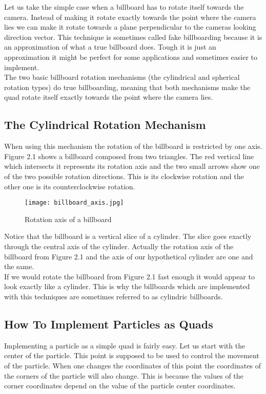 Let us take the simple case when a billboard has to rotate itself towards the camera. Instead of making it rotate exactly towards the point where the camera lies we can make it rotate towards a plane perpendicular to the cameras looking direction vector. This technique is sometimes called fake billboarding because it is an approximation of what a true billboard does. Tough it is just an approximation it might be perfect for some applications and sometimes easier to implement.\\

The two basic billboard rotation mechanisms (the cylindrical and spherical rotation types) do true billboarding, meaning that both mechanisms make the quad rotate itself exactly towards the point where the camera lies.

\newpage
\subsection{The Cylindrical Rotation Mechanism}
When using this mechanism the rotation of the billboard is restricted by one axis. Figure 2.1 shows a billboard composed from two triangles. The red vertical line which intersects it represents its rotation axis and the two small arrows show one of the two possible rotation directions. This is its clockwise rotation and the other one is its counterclockwise rotation.

\begin{figure}[h]
	\caption{Rotation axis of a billboard}
	\centering
	\texttt{[image: billboard\_axis.jpg]}
\end{figure}

Notice that the billboard is a vertical slice of a cylinder. The slice goes exactly through the central axis of the cylinder. Actually the rotation axis of the billboard from Figure 2.1 and the axis of our hypothetical cylinder are one and the same.\\

If we would rotate the billboard from Figure 2.1 fast enough it would appear to look exactly like a cylinder. This is why the billboards which are implemented with this techniques are sometimes referred to as cylindric billboards.\\

\newpage
\subsection{How To Implement Particles as Quads}
Implementing a particle as a simple quad is fairly easy. Let us start with the center of the particle. This point is supposed to be used to control the movement of the particle. When one changes the coordinates of this point the coordinates of the corners of the particle will also change. This is because the values of the corner coordinates depend on the value of the particle center coordinates.\\

